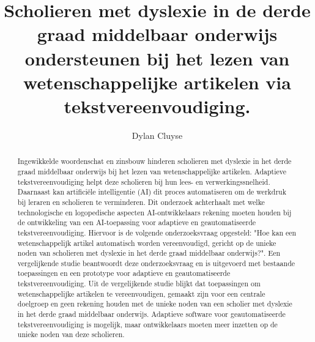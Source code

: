 \documentclass{hogent-article}
\title{Scholieren met dyslexie in de derde graad middelbaar onderwijs ondersteunen bij het lezen van wetenschappelijke artikelen via tekstvereenvoudiging.}
\author{Dylan Cluyse}
\begin{document}
	
\begin{abstract}
Ingewikkelde woordenschat en zinsbouw hinderen scholieren met dyslexie in het derde graad middelbaar onderwijs bij het lezen van wetenschappelijke artikelen. Adaptieve tekstvereenvoudiging helpt deze scholieren bij hun lees- en verwerkingssnelheid. Daarnaast kan artificiële intelligentie (AI) dit proces automatiseren om de werkdruk bij leraren en scholieren te verminderen. Dit onderzoek achterhaalt met welke technologische en logopedische aspecten AI-ontwikkelaars rekening moeten houden bij de ontwikkeling van een AI-toepassing voor adaptieve en geautomatiseerde tekstvereenvoudiging. Hiervoor is de volgende onderzoeksvraag opgesteld: "Hoe kan een wetenschappelijk artikel automatisch worden vereenvoudigd, gericht op de unieke noden van scholieren met dyslexie in het derde graad middelbaar onderwijs?". Een vergelijkende studie beantwoordt deze onderzoeksvraag en is uitgevoerd met bestaande toepassingen en een prototype voor adaptieve en geautomatiseerde tekstvereenvoudiging. Uit de vergelijkende studie blijkt dat toepassingen om wetenschappelijke artikelen te vereenvoudigen, gemaakt zijn voor een centrale doelgroep en geen rekening houden met de unieke noden van een scholier met dyslexie in het derde graad middelbaar onderwijs. Adaptieve software voor geautomatiseerde tekstvereenvoudiging is mogelijk, maar ontwikkelaars moeten meer inzetten op de unieke noden van deze scholieren. 
\end{abstract}


\tableofcontents



\printbibliography[heading=bibintoc]
\end{document}
